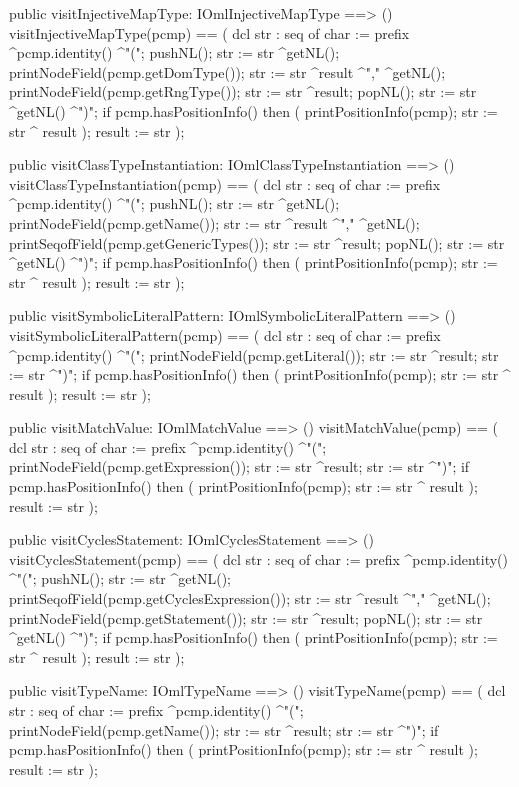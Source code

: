 \begin{vdm_al}
  public visitInjectiveMapType: IOmlInjectiveMapType ==> ()
  visitInjectiveMapType(pcmp) ==
    ( dcl str : seq of char := prefix ^pcmp.identity() ^"(";
      pushNL();
      str := str ^getNL();
      printNodeField(pcmp.getDomType());
      str := str ^result ^"," ^getNL();
      printNodeField(pcmp.getRngType());
      str := str ^result;
      popNL();
      str := str ^getNL() ^")";
      if pcmp.hasPositionInfo()
      then ( printPositionInfo(pcmp);
             str := str ^ result );
      result := str );

  public visitClassTypeInstantiation: IOmlClassTypeInstantiation ==> ()
  visitClassTypeInstantiation(pcmp) ==
    ( dcl str : seq of char := prefix ^pcmp.identity() ^"(";
      pushNL();
      str := str ^getNL();
      printNodeField(pcmp.getName());
      str := str ^result ^"," ^getNL();
      printSeqofField(pcmp.getGenericTypes());
      str := str ^result;
      popNL();
      str := str ^getNL() ^")";
      if pcmp.hasPositionInfo()
      then ( printPositionInfo(pcmp);
             str := str ^ result );
      result := str );

  public visitSymbolicLiteralPattern: IOmlSymbolicLiteralPattern ==> ()
  visitSymbolicLiteralPattern(pcmp) ==
    ( dcl str : seq of char := prefix ^pcmp.identity() ^"(";
      printNodeField(pcmp.getLiteral());
      str := str ^result;
      str := str ^")";
      if pcmp.hasPositionInfo()
      then ( printPositionInfo(pcmp);
             str := str ^ result );
      result := str );

  public visitMatchValue: IOmlMatchValue ==> ()
  visitMatchValue(pcmp) ==
    ( dcl str : seq of char := prefix ^pcmp.identity() ^"(";
      printNodeField(pcmp.getExpression());
      str := str ^result;
      str := str ^")";
      if pcmp.hasPositionInfo()
      then ( printPositionInfo(pcmp);
             str := str ^ result );
      result := str );

  public visitCyclesStatement: IOmlCyclesStatement ==> ()
  visitCyclesStatement(pcmp) ==
    ( dcl str : seq of char := prefix ^pcmp.identity() ^"(";
      pushNL();
      str := str ^getNL();
      printSeqofField(pcmp.getCyclesExpression());
      str := str ^result ^"," ^getNL();
      printNodeField(pcmp.getStatement());
      str := str ^result;
      popNL();
      str := str ^getNL() ^")";
      if pcmp.hasPositionInfo()
      then ( printPositionInfo(pcmp);
             str := str ^ result );
      result := str );

  public visitTypeName: IOmlTypeName ==> ()
  visitTypeName(pcmp) ==
    ( dcl str : seq of char := prefix ^pcmp.identity() ^"(";
      printNodeField(pcmp.getName());
      str := str ^result;
      str := str ^")";
      if pcmp.hasPositionInfo()
      then ( printPositionInfo(pcmp);
             str := str ^ result );
      result := str );


\end{vdm_al}
